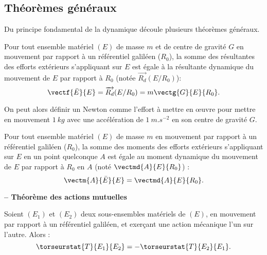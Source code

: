 \subsection{Théorèmes généraux}

Du principe fondamental de la dynamique découle plusieurs théorèmes généraux.

\begin{theoreme}
			Pour tout ensemble matériel $(E)$ de masse $m$ et de centre de gravité $G$ en mouvement par rapport à un référentiel galiléen ($R_0$), la somme des résultantes des efforts extérieurs s'appliquant sur $E$ est égale à la résultante dynamique du mouvement de $E$ par rapport à $R_0$ (notée $\overrightarrow{R_d}(E/R_0)$): 
$$\vectf{\bar E}{E}=\overrightarrow{R_d}(E/R_0)=m\vectg{G}{E}{R_0}.$$
\end{theoreme}

\begin{remarque}
On peut alors définir un Newton comme l'effort à mettre en \oe{}uvre pour mettre en mouvement $\SI{1}{kg}$ avec une accélération de $\SI{1}{m.s^{-2}}$ en son centre de gravité $G$.
\end{remarque}
\begin{theoreme}

			Pour tout ensemble matériel $(E)$ de masse $m$ en mouvement par rapport à un référentiel galiléen ($R_0$), la somme des moments des efforts extérieurs s'appliquant sur $E$ en un point quelconque $A$ est égale au moment dynamique du mouvement de $E$ par rapport à $R_0$ en $A$ (noté $\vectmd{A}{E}{R_0}$) : 
$$\vectm{A}{\bar E}{E}=\vectmd{A}{E}{R_0}.$$
\end{theoreme}

\begin{theoreme}\textbf{\textsf{\small -- Théorème des actions mutuelles}}

Soient $(E_1)$ et $(E_2)$ deux sous-ensembles matériels de $(E)$,
en mouvement par rapport à un référentiel galiléen, et exerçant une action mécanique l'un sur l'autre. Alors :
	$$\torseurstat{T}{E_1}{E_2}=-\torseurstat{T}{E_2}{E_1}.$$
\end{theoreme}
		


